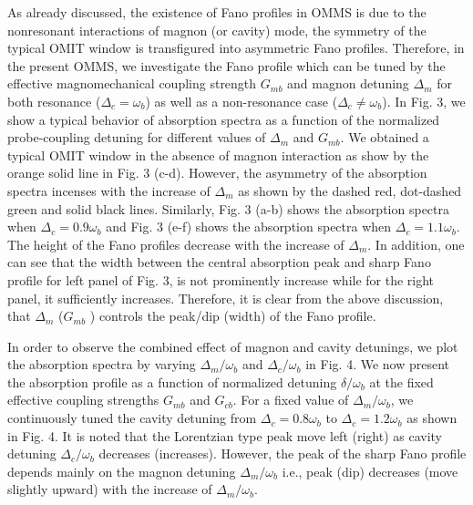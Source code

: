 \documentclass[aps,pra,superscriptaddress,balancelastpage,twocolumn]{revtex4}
\begin{document}
As already discussed, the existence of Fano profiles in OMMS is due to the
nonresonant interactions of magnon (or cavity) mode, the symmetry of the
typical OMIT window is transfigured into asymmetric Fano profiles.
Therefore, in the present OMMS, we investigate the Fano profile which can be
tuned by the effective magnomechanical coupling strength $G_{mb}$ and magnon
detuning $\Delta_{m}$ for both resonance ($\Delta_{c}=\omega_{b}$) as well
as a non-resonance case ($\Delta_{c}\neq\omega_{b}$). In Fig. 3, we show a
typical behavior of absorption spectra as a function of the normalized
probe-coupling detuning for different values of $\Delta_{m}$ and $G_{mb}$.
We obtained a typical OMIT window in the absence of magnon interaction as
show by the orange solid line in Fig. 3 (c-d). However, the asymmetry of the
absorption spectra incenses with the increase of $\Delta_{m}$ as shown by
the dashed red, dot-dashed green and solid black lines. Similarly, Fig. 3
(a-b) shows the absorption spectra when $\Delta_{c}=0.9\omega_{b}$ and Fig.
3 (e-f) shows the absorption spectra when $\Delta_{c}=1.1\omega_{b}$. The
height of the Fano profiles decrease with the increase of $\Delta_{m}$. In
addition, one can see that the width between the central absorption peak and
sharp Fano profile for left panel of Fig. 3, is not prominently increase
while for the right panel, it sufficiently increases.
Therefore, it is clear from the above discussion, that $\Delta_{m}$ ($G_{mb}$%
) controls the peak/dip (width) of the Fano profile.

In order to observe the combined effect of magnon and cavity detunings, we
plot the absorption spectra by varying $\Delta_{m}/\omega_{b}$ and $%
\Delta_{c}/\omega_{b}$ in Fig. 4. We now present the absorption profile as a
function of normalized detuning $\delta/\omega_{b}$ at the fixed effective
coupling strengths $G_{mb}$ and $G_{cb}$. For a fixed value of $%
\Delta_{m}/\omega_{b}$, we continuously tuned the cavity detuning from $%
\Delta_{c}=0.8\omega_{b}$ to $\Delta_{c}=1.2\omega_{b}$ as shown in Fig. 4.
It is noted that the Lorentzian type peak move left (right) as cavity
detuning $\Delta_{c}/\omega_{b}$ decreases (increases). However, the peak of
the sharp Fano profile depends mainly on the magnon detuning $%
\Delta_{m}/\omega_{b}$ i.e., peak (dip) decreases (move slightly upward)
with the increase of $\Delta_{m}/\omega_{b}$.
\end{document}
